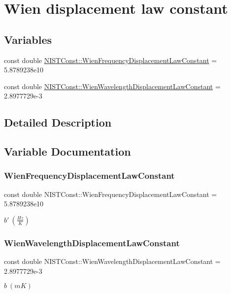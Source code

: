 \hypertarget{group___wien_displacement}{}\section{Wien displacement law constant}
\label{group___wien_displacement}
\subsection*{Variables}
\begin{DoxyCompactItemize}
\item 
const double \hyperlink{group___wien_displacement_ga73d0d9fcd8606de359046224389369e8}{N\+I\+S\+T\+Const\+::\+Wien\+Frequency\+Displacement\+Law\+Constant} = 5.\+8789238e10
\item 
const double \hyperlink{group___wien_displacement_gadd11261f459797b1750250b9d3ada92a}{N\+I\+S\+T\+Const\+::\+Wien\+Wavelength\+Displacement\+Law\+Constant} = 2.\+8977729e-\/3
\end{DoxyCompactItemize}


\subsection{Detailed Description}


\subsection{Variable Documentation}
\mbox{\label{group___wien_displacement_ga73d0d9fcd8606de359046224389369e8}} 
\subsubsection{\texorpdfstring{Wien\+Frequency\+Displacement\+Law\+Constant}{WienFrequencyDisplacementLawConstant}}
{\footnotesize\ttfamily const double N\+I\+S\+T\+Const\+::\+Wien\+Frequency\+Displacement\+Law\+Constant = 5.\+8789238e10}

$b' \ (\frac{Hz}{K})$ \mbox{\label{group___wien_displacement_gadd11261f459797b1750250b9d3ada92a}} 
\subsubsection{\texorpdfstring{Wien\+Wavelength\+Displacement\+Law\+Constant}{WienWavelengthDisplacementLawConstant}}
{\footnotesize\ttfamily const double N\+I\+S\+T\+Const\+::\+Wien\+Wavelength\+Displacement\+Law\+Constant = 2.\+8977729e-\/3}

$b \ (m K)$ 